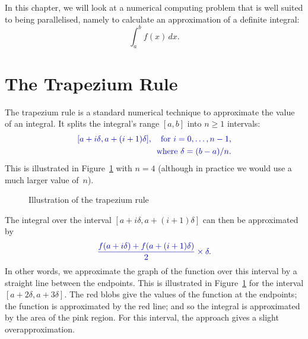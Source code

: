 In this chapter, we will look at a numerical computing problem that is well
suited to being parallelised, namely to calculate an approximation of a definite
integral:
\[
\int_a^b f(x) \, dx .
\]


\section{The Trapezium Rule}

The trapezium rule is a standard numerical technique to approximate the value
of an integral.  It splits the integral's range $[a,b]$ into $n \ge 1$
intervals:
\[\mstyle
\begin{align}
[{a+i\delta}, a+(i+1)\delta], 
  \quad\mbox{for $i = 0, \ldots, n-1$,} \\
\mbox{where $\delta = (b-a)/n$.}
\end{align}
\]
This is illustrated in Figure~\ref{fig:trapezium} with $n = 4$
(although in practice we would use a much larger value of~$n$).


\begin{figure}
\begin{center}
\def\labY{-0.16}
\def\fn{\x^3/240 + \x^2/10 - 0.5*\x + 1.5}   %
\end{center}
\caption{Illustration of the trapezium rule}
\label{fig:trapezium}
\end{figure}


The integral over the interval $[a+i\delta, a+(i+1)\delta]$ can then be
approximated by 
\[\mstyle
\frac{f(a+i\delta)+f(a+(i+1)\delta)}{2} \times \delta.
\]
In other words, we approximate the graph of the function over this interval by
a straight line between the endpoints.  This is illustrated in
Figure~\ref{fig:trapezium} for the interval $[a+2\delta, a+3\delta]$.  The red
blobs give the values of the function at the endpoints; the function is
approximated by the red line; and so the integral is approximated by the area
of the pink region.  For this interval, the approach gives a slight
overapproximation. 

